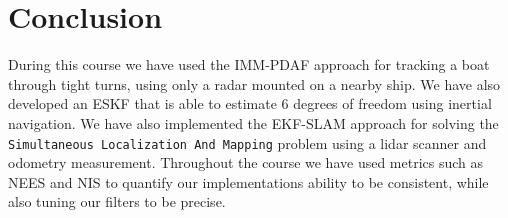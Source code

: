 \section{Conclusion}
During this course we have used the IMM-PDAF approach for tracking a boat through tight turns, using only a radar mounted on a nearby ship. We have also developed an ESKF that is able to estimate 6 degrees of freedom using inertial navigation. We have also implemented the EKF-SLAM approach for solving the \texttt{Simultaneous Localization And Mapping} problem using a lidar scanner and odometry measurement. Throughout the course we have used metrics such as NEES and NIS to quantify our implementations ability to be consistent, while also tuning our filters to be precise.
